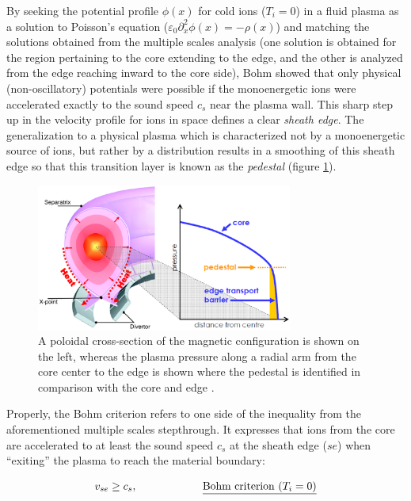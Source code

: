 \documentclass[11pt,titlepage]{report}
\begin{document}
By seeking the potential profile $\phi (x)$ for cold ions ($T_i = 0$) in a fluid plasma as a solution to Poisson's equation ($\varepsilon_0\partial_{x}^2\phi (x) = -\rho(x)$) and matching the solutions obtained from the multiple scales analysis (one solution is obtained for the region pertaining to the core extending to the edge, and the other is analyzed from the edge reaching inward to the core side), Bohm showed that only physical (non-oscillatory) potentials were possible if the monoenergetic ions were accelerated exactly to the sound speed $c_s$ near the plasma wall. This sharp step up in the velocity profile for ions in space defines a clear \emph{sheath edge}. The generalization to a physical plasma which is characterized not by a monoenergetic source of ions, but rather by a distribution results in a smoothing of this sheath edge so that this transition layer is known as the \emph{pedestal} (figure \ref{fig:pedestal_and_poloidal_xsec}).

\begin{figure}[h!]
  \centering
    \includegraphics[width=0.75\textwidth]{graphics/pedestal_and_poloidal_xsec}
  \caption{A poloidal cross-section of the magnetic configuration is shown on the left, whereas the plasma pressure along a radial arm from the core center to the edge is shown where the pedestal is identified in comparison with the core and edge \cite{ConnorXX}.}
  \label{fig:pedestal_and_poloidal_xsec}
\end{figure}


Properly, the Bohm criterion refers to one side of the inequality from the aforementioned multiple scales stepthrough. It expresses that ions from the core are accelerated to at least the sound speed $c_s$ at the sheath edge ($se$) when ``exiting'' the plasma to reach the material boundary:

\begin{equation}
v_{se} \geq c_s , \qquad \qquad \qquad \text{\underline{Bohm criterion ($T_i = 0$)}\label{eq:Bohm_criterion_fluid}}
\end{equation}
\end{document}
